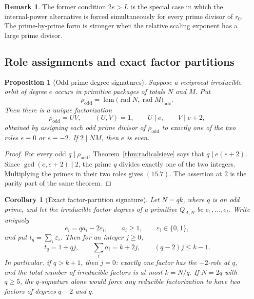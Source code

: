\documentclass[11pt]{article}
\newtheorem{proposition}[theorem]{Proposition}
\newtheorem{corollary}[theorem]{Corollary}
\theoremstyle{definition}
\newtheorem{remark}[theorem]{Remark}
\begin{document}
\begin{remark}
The former condition \(2e>L\) is the special case in which the
internal-power alternative is forced simultaneously for every prime divisor
of \(r_0\).  The prime-by-prime form is stronger when the relative scaling
exponent has a large prime divisor.
\end{remark}

\subsection{Role assignments and exact factor partitions}

\begin{proposition}[Odd-prime degree signatures]
\label{prop:rolesignature}
Suppose a reciprocal irreducible orbit of degree \(e\) occurs in primitive
packages of totals \(N\) and \(M\).  Put
\[
 \rho_{\mathrm{odd}}
 =\operatorname{lcm}\bigl(\operatorname{rad}N,
                           \operatorname{rad}M\bigr)_{\mathrm{odd}}.
\]
Then there is a unique factorization
\begin{equation}
 \rho_{\mathrm{odd}}=UV,
 \qquad (U,V)=1,
 \qquad U\mid e,
 \qquad V\mid e+2,
 \tag{15.7}
\end{equation}
obtained by assigning each odd prime divisor of \(\rho_{\mathrm{odd}}\) to
exactly one of the two roles \(e\equiv0\) or \(e\equiv-2\).  If
\(2\mid NM\), then \(e\) is even.
\end{proposition}

\begin{proof}
For every odd \(q\mid\rho_{\mathrm{odd}}\),
Theorem~\ref{thm:radicalsieve} says that \(q\mid e(e+2)\).  Since
\(\gcd(e,e+2)\mid2\), the prime \(q\) divides exactly one of the two
integers.  Multiplying the primes in their two roles gives \((15.7)\).  The
assertion at \(2\) is the parity part of the same theorem.
\end{proof}

\begin{corollary}[Exact factor-partition signature]
\label{cor:partitionsignature}
Let \(N=qk\), where \(q\) is an odd prime, and let the irreducible factor
degrees of a primitive \(Q_{A,B}\) be \(e_1,\ldots,e_t\).  Write uniquely
\[
 e_i=qa_i-2\varepsilon_i,
 \qquad a_i\geq1,
 \qquad \varepsilon_i\in\{0,1\},
\]
and put \(t_q=\sum_i\varepsilon_i\).  Then for an integer \(j\geq0\),
\begin{equation}
 t_q=1+qj,
 \qquad
 \sum_i a_i=k+2j,
 \qquad
 (q-2)j\leq k-1.
 \tag{15.8}
\end{equation}
In particular, if \(q>k+1\), then \(j=0\): exactly one factor has the
\(-2\)-role at \(q\), and the total number of irreducible factors is at
most \(k=N/q\).  If \(N=2q\) with \(q\geq5\), the \(q\)-signature
alone would force any reducible factorization to have two factors of degrees
\(q-2\) and \(q\).
\end{corollary}
\end{document}
